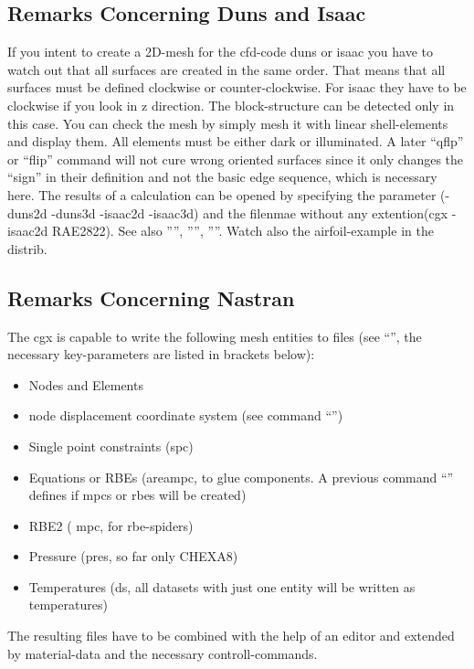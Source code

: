 \documentclass{article}
\begin{document}
\begin{appendix}
\subsection{\label{Remarks Concerning Duns and Isaac}Remarks Concerning Duns and Isaac}
If you intent to create a 2D-mesh for the cfd-code duns or isaac you have to watch out that all surfaces are created in the same order. That means that all surfaces must be defined clockwise or counter-clockwise. For isaac they have to be clockwise if you look in z direction. The block-structure can be detected only in this case. You can check the mesh by simply mesh it with linear shell-elements and display them. All elements must be either dark or illuminated. A later ``qflp'' or ``flip'' command will not cure wrong oriented surfaces since it only changes the ``sign'' in their definition and not the basic edge sequence, which is necessary here. The results of a calculation can be opened by specifying the parameter (-duns2d -duns3d -isaac2d -isaac3d) and the filenmae without any extention(cgx -isaac2d RAE2822). See also '''', '''', ''''. Watch also the airfoil-example in the distrib.

\subsection{\label{Remarks Concerning Nastran}Remarks Concerning Nastran}
The cgx is capable to write the following mesh entities to files (see ``'', the necessary key-parameters are listed in brackets below):
\begin{itemize}
\item Nodes and Elements 
\item node displacement coordinate system (see command ``'')
\item Single point constraints (spc)
\item Equations or RBEs (areampc, to glue components. A previous command ``'' defines if mpcs or rbes will be created)
\item RBE2 ( mpc, for rbe-spiders)
\item Pressure (pres, so far only CHEXA8)
\item Temperatures (ds, all datasets with just one entity will be written as temperatures)
\end{itemize}
The resulting files have to be combined with the help of an editor and extended by material-data and the necessary controll-commands. 


\end{appendix}
\end{document}
